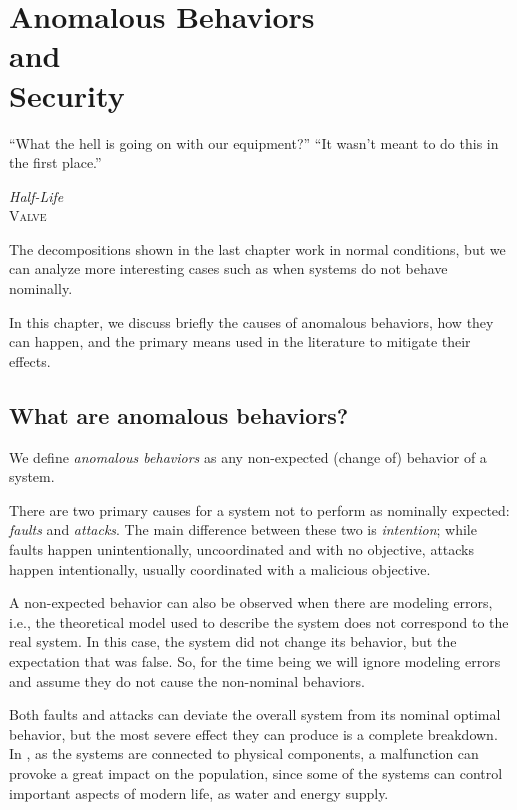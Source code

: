 \documentclass[../main.tex]{subfiles}
\begin{document}
\chapter[Anomalous Behaviors \& Security]{Anomalous Behaviors\\and\\ Security}\label{sec:anomalous}


\epigraph{``What the hell is going on with our equipment?''
``It wasn't meant to do this in the first place.''}
{\textit{Half-Life}\\\textsc{Valve}}

The decompositions shown in the last chapter work in normal conditions, but we can analyze more interesting cases such as when systems do not behave nominally.

In this chapter, we discuss briefly the causes of anomalous behaviors, how they can happen, and the primary means used in the literature to mitigate their effects.

\minitoc%

\section{What are anomalous behaviors?}
We define \emph{anomalous behaviors} as any non-expected (change of) behavior of a system.

There are two primary causes for a system not to perform as nominally expected: \emph{faults} and \emph{attacks}.
The main difference between these two is \emph{intention}; while faults happen unintentionally, uncoordinated and with no objective, attacks happen intentionally, usually coordinated with a malicious objective.

\begin{remark}
  A non-expected behavior can also be observed when there are modeling errors, i.e., the theoretical model used to describe the system does not correspond to the real system.
  In this case, the system did not change its behavior, but the expectation that was false.
  So, for the time being we will ignore modeling errors and assume they do not cause the non-nominal behaviors.
\end{remark}

Both faults and attacks can deviate the overall system from its nominal optimal behavior, but the most severe effect they can produce is a complete breakdown.
In \cps{}, as the systems are connected to physical components, a malfunction can provoke a great impact on the population, since some of the systems can control important
aspects of modern life, as water and energy supply.
\end{document}
